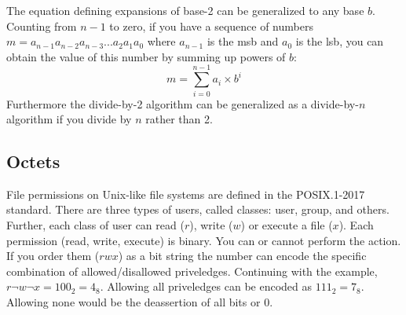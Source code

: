 The equation defining expansions of \gls{base-2} can be generalized to any base $b$. Counting from $n-1$ 
to zero, if you have a sequence of numbers $m = a_{n-1}a_{n-2}a_{n-3}...a_2a_1a_0$ 
where $a_{n-1}$ is the \gls{msb} and $a_0$ is the \gls{lsb}, you can obtain the value of this number 
by summing up powers of $b$:
%
\begin{equation}\label{eq:basen}
    m = \sum_{i=0}^{n-1} a_i \times b^i
\end{equation}
%
Furthermore the divide-by-2 algorithm can be generalized as a divide-by-$n$ algorithm if you divide by $n$ rather than 2.

\begin{figure}[h]
\end{figure}

\begin{figure}[h]
\end{figure}

\subsection{Octets}

File permissions on Unix-like file systems are defined in the POSIX.1-2017 standard. There 
are three types of users, called classes: user, group, and others. Further, each class of user can 
read ($r$), write ($w$) or execute a file ($x$). Each permission (read, write, execute) is binary. 
You can or cannot perform the action. If you order them ($rwx$) as a bit string the number can 
encode the specific combination of allowed/disallowed priveledges. Continuing with the example, 
$r\neg w \neg x = 100_2 = 4_{8}$. Allowing all priveledges can be encoded 
as $111_2 = 7_{8}$.  Allowing none would be the deassertion of all bits or $0$.


